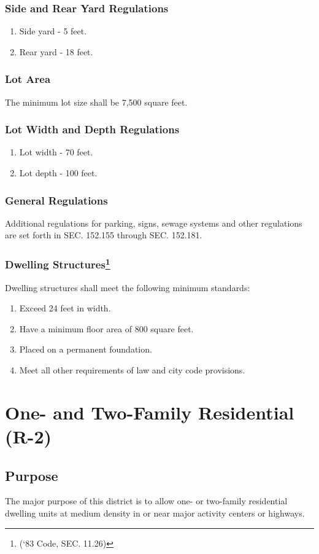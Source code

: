 \subsubsection{Side and Rear Yard Regulations}
\begin{enumerate}[{\indent}a)]
    \item Side yard - 5 feet.  
    \item Rear yard - 18 feet.
\end{enumerate}
\subsubsection{Lot Area}
The minimum lot size shall be 7,500 square feet.
\subsubsection{Lot Width and Depth Regulations}
\begin{enumerate}[{\indent}a)]
    \item Lot width - 70 feet.  
    \item Lot depth - 100 feet.
\end{enumerate}
\subsubsection{General Regulations}
Additional regulations for parking, signs, sewage systems and other regulations are set forth in SEC. 152.155 through SEC. 152.181.
\subsubsection{Dwelling Structures\footnote{(‘83 Code, SEC. 11.26)}}
Dwelling structures shall meet the following minimum standards:
\begin{enumerate}[{\indent}a)]
    \item Exceed 24 feet in width.
    \item Have a minimum floor area of 800 square feet.
    \item Placed on a permanent foundation.
    \item Meet all other requirements of law and city code provisions.
\end{enumerate}
\section{One- and Two-Family Residential (R-2)}
\subsection{Purpose}
The major purpose of this district is to allow one- or two-family residential dwelling units at medium density in or near major activity centers or highways.
